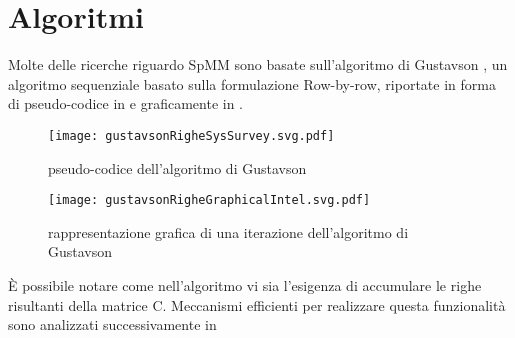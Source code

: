 \section{Algoritmi}
Molte delle ricerche riguardo SpMM sono basate sull'algoritmo di Gustavson ,
un algoritmo sequenziale basato sulla formulazione Row-by-row, riportate in forma di pseudo-codice 
in  e graficamente in .\\

\begin{figure}[H]
  \caption[pseudocodice Gustavson]{pseudo-codice dell'algoritmo di Gustavson}
  \centering \texttt{[image: gustavsonRigheSysSurvey.svg.pdf]} \decoRule
  \label{figCode:gustavsonRigheSysSurvey}
\end{figure}
\begin{figure}[H]
  \caption[rappresentazione Gustavson]{rappresentazione grafica di una iterazione dell'algoritmo di Gustavson}
  \centering \texttt{[image: gustavsonRigheGraphicalIntel.svg.pdf]} \decoRule
  \label{fig:gustavsonRigheGraphicalIntel}
\end{figure}
È possibile notare come nell'algoritmo vi sia l'esigenza di accumulare le righe
risultanti della matrice C. Meccanismi efficienti per realizzare questa
funzionalità sono analizzati successivamente in  %
\\



